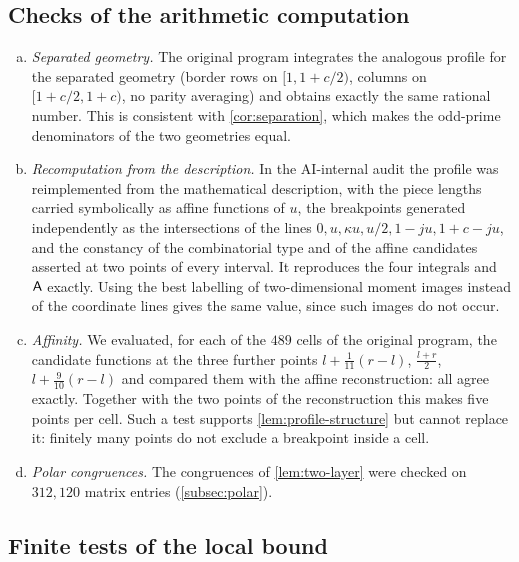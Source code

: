 \subsection{Checks of the arithmetic computation}\label{subsec:arith-checks}

\begin{enumerate}[(a)]
  \item \emph{Separated geometry.} The original program integrates the analogous profile for the
  separated geometry (border rows on $[1,1+c/2)$, columns on $[1+c/2,1+c)$, no parity averaging)
  and obtains exactly the same rational number. This is consistent with \cref{cor:separation},
  which makes the odd-prime denominators of the two geometries equal.
  \item \emph{Recomputation from the description.} In the AI-internal audit the profile was
  reimplemented from the mathematical description, with the piece lengths carried symbolically
  as affine functions of $u$, the breakpoints generated independently as the intersections of
  the lines $0,u,\kappa u,u/2,1-ju,1+c-ju$, and the constancy of the combinatorial type and of the
  affine candidates asserted at two points of every interval. It reproduces the four integrals
  and $\mathsf{A}$ exactly. Using the best labelling of two-dimensional moment images instead of the
  coordinate lines gives the same value, since such images do not occur.
  \item \emph{Affinity.} We evaluated, for each of the $489$ cells of the original program, the
  candidate functions at the three further points $l+\frac1{11}(r-l)$, $\frac{l+r}2$,
  $l+\frac9{10}(r-l)$ and compared them with the affine reconstruction: all agree exactly.
  Together with the two points of the reconstruction this makes five points per cell. Such a test
  supports \cref{lem:profile-structure} but cannot replace it: finitely many points do not
  exclude a breakpoint inside a cell.
  \item \emph{Polar congruences.} The congruences of \cref{lem:two-layer} were checked on
  $312{,}120$ matrix entries (\cref{subsec:polar}).
\end{enumerate}

\subsection{Finite tests of the local bound}\label{subsec:finite-checks}


